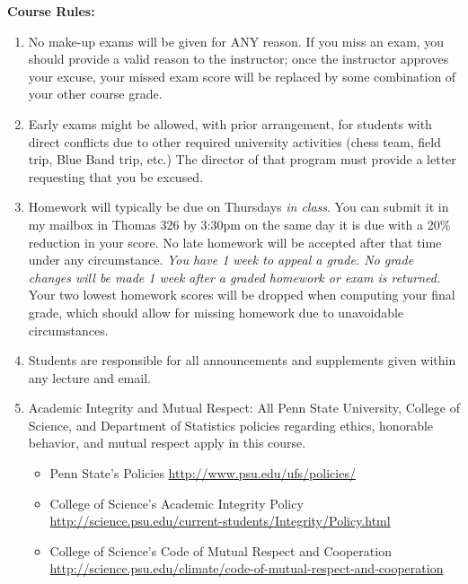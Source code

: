 \documentclass[10pt]{article}
\begin{document}
{\bf Course Rules:}
\begin{enumerate}
\item No make-up exams will be given for ANY reason. If you miss an
  exam, you should provide a valid reason to the instructor; once the
  instructor approves your excuse, your missed exam score will be
  replaced by some combination of your other course grade.
\item Early exams might be allowed, with prior arrangement, for
  students with direct conflicts due to other required university
  activities (chess team, field trip, Blue Band trip, etc.) The
  director of that program must provide a letter requesting that you
  be excused.
\item Homework will typically be due on Thursdays {\it in class}. You
  can submit it in my mailbox in Thomas 326 by 3:30pm on the same day
  it is due with a 20\% reduction in your score. No late homework will
  be accepted after that time under any circumstance. {\it You have 1
    week to appeal a grade. No grade changes will be made 1 week after
    a graded homework or exam is returned.}  Your two lowest homework
  scores will be dropped when computing your final grade, which should
  allow for missing homework due to unavoidable circumstances.
\item Students are responsible for all announcements and supplements
  given within any lecture and email.
\item Academic Integrity and Mutual Respect: All Penn State University, College of Science, and 
Department of Statistics policies regarding ethics, honorable behavior, and mutual respect apply in 
this course. %
\begin{itemize}
\item Penn State's Policies \url{http://www.psu.edu/ufs/policies/}
\item College of Science's Academic Integrity Policy \url{http://science.psu.edu/current-students/Integrity/Policy.html}
\item College of Science's Code of Mutual Respect and Cooperation
  \url{http://science.psu.edu/climate/code-of-mutual-respect-and-cooperation}
\end{itemize}

\end{enumerate}
\end{document}
